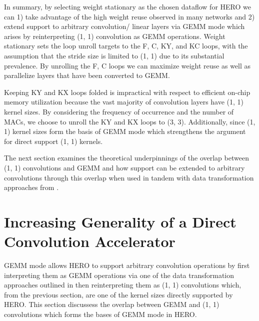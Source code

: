 In summary, by selecting weight stationary as the chosen dataflow for HERO we
can 1) take advantage of the high weight reuse observed in
many networks and 2) extend support
to arbitrary convolution/ linear layers via GEMM mode which arises by
reinterpreting (1, 1) convolution as GEMM operations. Weight stationary sets the
loop unroll targets to the F, C, KY, and KC loops, with the assumption that the
stride size is limited to (1, 1) due to its substantial prevalence. By unrolling the F, C
loops we can maximize weight reuse as well as parallelize layers that have been
converted to GEMM.

Keeping KY and KX loops folded is impractical with respect to efficient on-chip
memory utilization because the vast majority of convolution layers have (1, 1)
kernel sizes. By considering the frequency of occurrence and the number of MACs,
we choose to unroll the KY and KX loops to (3, 3). Additionally, since (1, 1)
kernel sizes form the basis of GEMM mode which strengthens the argument for
direct support (1, 1) kernels.

The next section examines the theoretical underpinnings of the overlap between
(1, 1) convolutions and GEMM and how support can be extended to arbitrary
convolutions through this overlap when used in tandem with data transformation
approaches from \cite{cafe_con_troll}.


\clearpage 

\section{Increasing Generality of a Direct Convolution Accelerator}
\label{chap:dda:dataflow_dse:GEMM_mode}

GEMM mode allows HERO to support arbitrary convolution operations by first
interpreting them as GEMM operations via one of the data transformation
approaches outlined in \cite{cafe_con_troll} then reinterpreting them as (1, 1)
convolutions which, from the previous section, are one of the kernel sizes
directly supported by HERO. This section discussess the overlap between GEMM and
(1, 1) convolutions which forms the bases of GEMM mode in HERO. 

